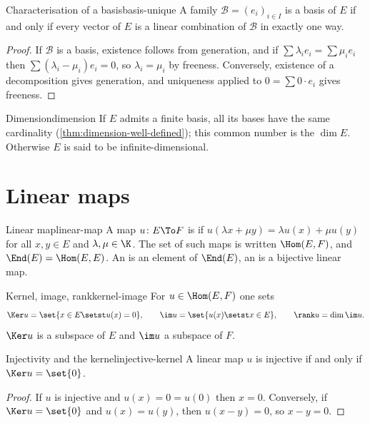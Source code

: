 \begin{proposition}{Characterisation of a basis}{basis-unique}
A family $\mathcal{B}=(e_i)_{i\in I}$ is a basis of $E$ if and only if every
vector of $E$ is a linear combination of $\mathcal{B}$ in exactly one way.
\end{proposition}

\begin{proof}
If $\mathcal{B}$ is a basis, existence follows from generation, and if
$\sum\lambda_i e_i=\sum\mu_i e_i$ then $\sum(\lambda_i-\mu_i)e_i=0$, so
$\lambda_i=\mu_i$ by freeness. Conversely, existence of a decomposition gives
generation, and uniqueness applied to $0=\sum 0\cdot e_i$ gives freeness.
\end{proof}

\begin{definition}{Dimension}{dimension}
If $E$ admits a finite basis, all its bases have the same cardinality
(\cref{thm:dimension-well-defined}); this common number is the 
$\dim E$. Otherwise $E$ is said to be infinite-dimensional.
\end{definition}

\section{Linear maps}

\begin{definition}{Linear map}{linear-map}
A map $u\colon E\To F$ is  if $u(\lambda x+\mu y)=\lambda u(x)+\mu u(y)$
for all $x,y\in E$ and $\lambda,\mu\in\K$. The set of such maps is written
$\Hom(E,F)$, and $\End(E)=\Hom(E,E)$. An  is an element of
$\End(E)$, an  is a bijective linear map.
\end{definition}

\begin{definition}{Kernel, image, rank}{kernel-image}
For $u\in\Hom(E,F)$ one sets
\[
  \Ker u=\set{x\in E\setst u(x)=0},\qquad
  \im u=\set{u(x)\setst x\in E},\qquad
  \rank u=\dim\im u .
\]
$\Ker u$ is a subspace of $E$ and $\im u$ a subspace of $F$.
\end{definition}

\begin{proposition}{Injectivity and the kernel}{injective-kernel}
A linear map $u$ is injective if and only if $\Ker u=\set{0}$.
\end{proposition}

\begin{proof}
If $u$ is injective and $u(x)=0=u(0)$ then $x=0$. Conversely, if
$\Ker u=\set{0}$ and $u(x)=u(y)$, then $u(x-y)=0$, so $x-y=0$.
\end{proof}

